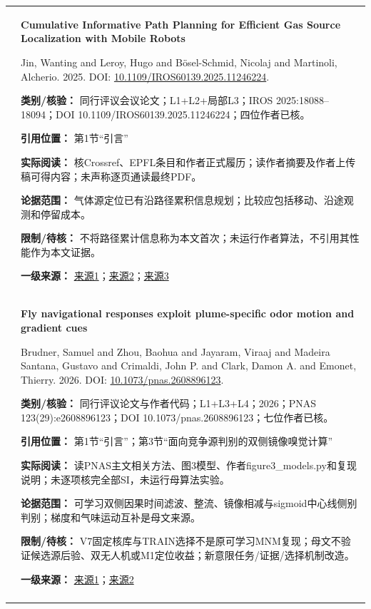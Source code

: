 \begin{longtable}{@{}>{\raggedright\arraybackslash}p{0.7cm}>{\raggedright\arraybackslash}p{14.8cm}@{}}
14 & \textbf{Cumulative Informative Path Planning for Efficient Gas Source Localization with Mobile Robots}\par Jin, Wanting and Leroy, Hugo and Bösel-Schmid, Nicolaj and Martinoli, Alcherio. 2025. DOI: \url{10.1109/IROS60139.2025.11246224}. \par\textbf{类别/核验：} 同行评议会议论文；L1+L2+局部L3；IROS 2025:18088–18094；DOI 10.1109/IROS60139.2025.11246224；四位作者已核。\par\textbf{引用位置：} 第1节“引言”\par\textbf{实际阅读：} 核Crossref、EPFL条目和作者正式履历；读作者摘要及作者上传稿可得内容；未声称逐页通读最终PDF。\par\textbf{论据范围：} 气体源定位已有沿路径累积信息规划；比较应包括移动、沿途观测和停留成本。\par\textbf{限制/待核：} 不将路径累计信息称为本文首次；未运行作者算法，不引用其性能作为本文证据。\par\textbf{一级来源：} \href{https://infoscience.epfl.ch/entities/publication/3a6f868c-8d68-4aaa-937e-900941d3c694}{来源1}；\href{https://disalw3.epfl.ch/people/alcherio/files/AM_full_CV.pdf}{来源2}；\href{https://www.epfl.ch/labs/disal/research/gassensingstructure/}{来源3} \\\addlinespace[6pt]
15 & \textbf{Fly navigational responses exploit plume-specific odor motion and gradient cues}\par Brudner, Samuel and Zhou, Baohua and Jayaram, Viraaj and Madeira Santana, Gustavo and Crimaldi, John P. and Clark, Damon A. and Emonet, Thierry. 2026. DOI: \url{10.1073/pnas.2608896123}. \par\textbf{类别/核验：} 同行评议论文与作者代码；L1+L3+L4；2026；PNAS 123(29):e2608896123；DOI 10.1073/pnas.2608896123；七位作者已核。\par\textbf{引用位置：} 第1节“引言”；第3节“面向竞争源判别的双侧镜像嗅觉计算”\par\textbf{实际阅读：} 读PNAS主文相关方法、图3模型、作者figure3\_models.py和复现说明；未逐项核完全部SI，未运行母算法实验。\par\textbf{论据范围：} 可学习双侧因果时间滤波、整流、镜像相减与sigmoid中心线侧别判别；梯度和气味运动互补是母文来源。\par\textbf{限制/待核：} V7固定核库与TRAIN选择不是原可学习MNM复现；母文不验证候选源后验、双无人机或M1定位收益；新意限任务/证据/选择机制改造。\par\textbf{一级来源：} \href{https://www.pnas.org/doi/10.1073/pnas.2608896123}{来源1}；\href{https://github.com/emonetlab/GradientMotionMultiplePlumes}{来源2} \\\addlinespace[6pt]

\end{longtable}

